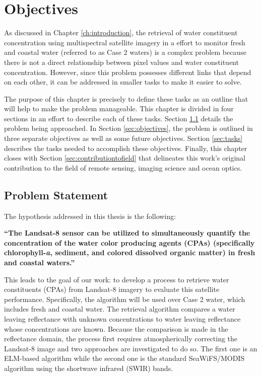 \chapter{Objectives}
\label{ch:objectives}

As discussed in Chapter \ref{ch:introduction},  the retrieval of water constituent concentration using multispectral satellite imagery in a effort to monitor fresh and coastal water (referred to as Case 2 waters) is a complex problem because there is not a direct relationship between pixel values and water constituent concentration. However, since this problem possesses different links that depend on each other, it can be addressed in smaller tasks to make it easier to solve. 

The purpose of this chapter is precisely to define these tasks as an outline that will help to make the problem manageable. This chapter is divided in four sections in an effort to describe each of these tasks. Section \ref{sec:problemstatement} details the problem being approached. In Section \ref{sec:objectives}, the problem is outlined in {\color{red} three} separate objectives as well as some future objectives. Section \ref{sec:tasks} describes the tasks needed to accomplish these objectives. Finally, this chapter closes with Section \ref{sec:contributiontofield} that delineates this work's original contribution to the field of remote sensing, imaging science and ocean optics. 
\section{Problem Statement}
\label{sec:problemstatement}
The hypothesis addressed in this thesis is the following: 

{ \bf ``The Landsat-8 sensor can be utilized to simultaneously quantify the concentration of the water color producing agents (CPAs) (specifically chlorophyll-{\it a}, { sediment}, and colored dissolved organic matter) in fresh and coastal waters.''} 

This leads to the goal of our work: to develop a process to retrieve water constituents (CPAs) from Landsat-8 imagery to evaluate this satellite performance. Specifically, the algorithm will be used over Case 2 water, which includes fresh and coastal water. The retrieval algorithm compares a water leaving reflectance with unknown concentrations to water leaving reflectance whose concentrations are known. Because the comparison is made in the reflectance domain, the process first requires atmospherically correcting the Landsat-8 image and two approaches are investigated to do so. The first one is an ELM-based algorithm while the second one is the standard SeaWiFS/MODIS algorithm using the shortwave infrared (SWIR) bands.

